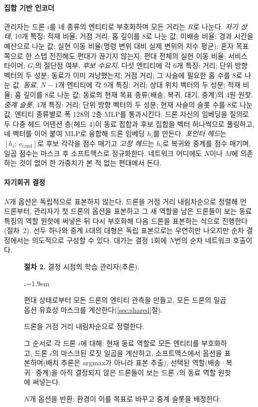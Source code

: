 \documentclass[final,5p,times,twocolumn]{elsarticle}
\newcounter{procstep}
\newenvironment{procsteps}{\setcounter{procstep}{0}\begin{list}{\stepcounter{procstep}\textbf{\theprocstep.}}{\leftmargin=1.9em\itemsep=1.5pt\parsep=0pt\topsep=3pt}}{\end{list}}
\begin{document}
\paragraph{집합 기반 인코더}
관리자는 드론 $i$를 네 종류의 엔티티로 부호화하며 모든 거리는 $R$로 나눈다. \emph{자기 상태},
10개 특징: 적재 비율; 거점 거리; 홉 깊이를 8로 나눈 값; 미배송 비율; 경과 시간을 예산으로 나눈
값; 실현 이동 비율(명령 변위 대비 실제 변위의 지수 평균); 혼자 목표 쪽으로 한 스텝 전진해도 편대가
끊기지 않는지; 편대 전체의 실현 이동 비율; 서비스 타이머; $G_t$의 절단점 여부. \emph{후보
수요지}, 다섯 엔티티에 각 6개 특징: 거리; 단위 방향 벡터의 두 성분; 동료가 이미 겨냥했는지; 거점
거리; 그 사슬에 필요한 홉 수를 8로 나눈 값. \emph{동료}, $N-1$개 엔티티에 각 9개 특징: 거리;
상대 위치 벡터의 두 성분; 적재 비율; 홉 깊이를 8로 나눈 값; 동료의 현재 목표 종류(배송, 복귀,
대기, 중계)의 4원 원핫. \emph{중계 슬롯}, 4개 특징: 거리; 단위 방향 벡터의 두 성분; 현재 사슬의
슬롯 수를 8로 나눈 값. 엔티티 종류별로 폭 128의 2층 MLP를 통과시킨다. 드론
자신의 임베딩을 질의로 두 다중 헤드 어텐션 층(헤드 4)이 동료 집합과 후보 집합을 벡터 하나씩으로
풀링하고, 네 벡터를 이어 붙여 MLP로 융합해 드론 임베딩 $h_i$를 만든다. \emph{포인터 헤드}는
$[h_i;\, e_{\mathrm{cand}}]$로 후보 각각을 점수 매기고 \emph{고정 헤드}는 $h_i$로 복귀와 중계를
점수 매기며, 일곱 점수는 마스크 후 소프트맥스로 정규화한다. 네트워크 어디에도 $N$이나 $M$에
의존하는 것이 없어 한 가중치가 본 적 없는 편대에서 돈다.

\paragraph{자기회귀 결정}
$N$개 옵션은 독립적으로 표본하지 않는다. 드론을 거점 거리 내림차순으로 정렬해 먼 드론부터, 관리자가
첫 드론의 옵션을 표본하고 그 새 역할을 남은 드론들이 보는 동료 특징의 역할 원핫에 써넣은 뒤 다시
부호화해 다음 드론을 표본하는 식으로 진행한다(절차~2). 선두 하나와 중계 $k$대의 대형은 독립
표본으로는 우연히만 나오지만 순차 결정에서는 의도적으로 구성할 수 있다. 대가는 결정 1회에 $N$번의
순차 네트워크 호출이다.

\begin{figure}[t]
\footnotesize
\noindent\textbf{절차 2.} 결정 시점의 학습 관리자(추론).
\begin{procsteps}
\item 편대 상태로부터 모든 드론의 엔티티 관측을 만들고, 모든 드론의 일곱 옵션 유효성 마스크를
계산한다(\ref{sec:shared}절).
\item 드론을 거점 거리 내림차순으로 정렬한다.
\item 그 순서로 각 드론 $i$에 대해: 현재 동료 역할로 모든 엔티티를 부호화하고, 드론 $i$의 마스크된
로짓 일곱을 계산하고, 소프트맥스에서 옵션을 표본하며(배치 추론은 argmax가 아니라 표본 추출),
선택된 역할(배송·복귀·중계)을 아직 결정되지 않은 드론들이 보는 드론 $i$의 동료 역할 원핫에 써넣는다.
\item $N$개 옵션을 반환; 환경이 이를 목표로 바꾸고 중계 슬롯을 배정한다.
\end{procsteps}
\end{figure}
\end{document}
